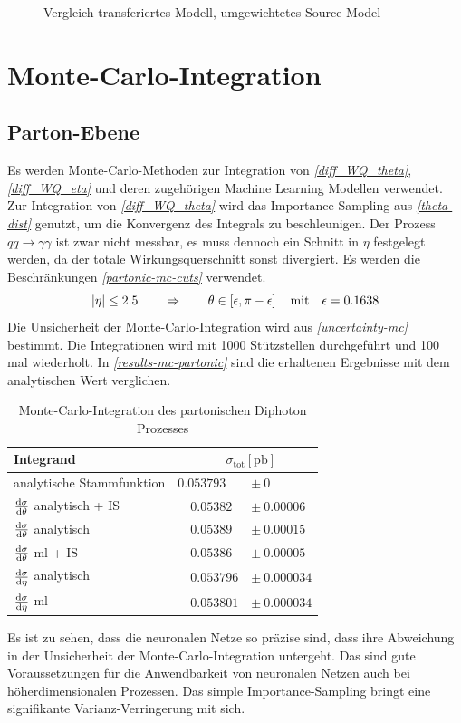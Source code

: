 \begin{figure}[h]
	\caption{Vergleich transferiertes Modell, umgewichtetes Source Model}
	\label{Vgl-transfer-rw}
\end{figure}
\section{Monte-Carlo-Integration}
\subsection{Parton-Ebene}
Es werden Monte-Carlo-Methoden zur Integration von \textit{\autoref{diff_WQ_theta}}, \textit{\autoref{diff_WQ_eta}} und deren zugehörigen Machine Learning Modellen verwendet. Zur Integration von \textit{\autoref{diff_WQ_theta}} wird das Importance Sampling aus \textit{\autoref{theta-dist}} genutzt, um die Konvergenz des Integrals zu beschleunigen. Der Prozess $qq \rightarrow \gamma \gamma$ ist zwar nicht messbar, es muss dennoch ein Schnitt in $\eta$ festgelegt werden, da der totale Wirkungsquerschnitt sonst divergiert. Es werden die Beschränkungen \textit{\autoref{partonic-mc-cuts}} verwendet.
\begin{equation}
\abs{\eta} \leq 2.5 \qquad \Rightarrow \qquad \theta \in \left[\epsilon, \pi - \epsilon \right] \quad \text{mit} \quad \epsilon = 0.1638
\label{partonic-mc-cuts}
\end{equation}
Die Unsicherheit der Monte-Carlo-Integration wird aus \textit{\autoref{uncertainty-mc}} bestimmt. Die Integrationen wird mit 1000 Stützstellen durchgeführt und 100 mal wiederholt. In \textit{\autoref{results-mc-partonic}} sind die erhaltenen Ergebnisse mit dem analytischen Wert verglichen.
\begin{table}[bh]
	\centering
	\begin{tabular}{lll}
		Integrand & \multicolumn{2}{c}{$\quad \sigma_{\text{tot}}[\text{pb}]$} \\
		\hline
		analytische Stammfunktion& \quad  $0.053793$ &$\pm~ 0$\\
		$\derivative{\sigma}{\theta}$ analytisch + IS & $\quad 0.05382 $&$\pm~ 0.00006 $ \\
		$\derivative{\sigma}{\theta}$ analytisch & $\quad 0.05389$ &$\pm~ 0.00015 $ \\
		$\derivative{\sigma}{\theta}$ ml + IS &$\quad 0.05386$ &$\pm~ 0.00005$ \\
		$\derivative{\sigma}{\eta}$ analytisch & $\quad 0.053796 $&$\pm~ 0.000034$ \\
		$\derivative{\sigma}{\eta}$ ml & $\quad 0.053801 $&$\pm~ 0.000034$ \\
	\end{tabular}
	\caption{Monte-Carlo-Integration des partonischen Diphoton Prozesses}
	\label{results-mc-partonic}
\end{table}
Es ist zu sehen, dass die neuronalen Netze so präzise sind, dass ihre Abweichung in der Unsicherheit der Monte-Carlo-Integration untergeht. Das sind gute Voraussetzungen für die Anwendbarkeit von neuronalen Netzen auch bei höherdimensionalen Prozessen. Das simple Importance-Sampling bringt eine signifikante Varianz-Verringerung mit sich.
